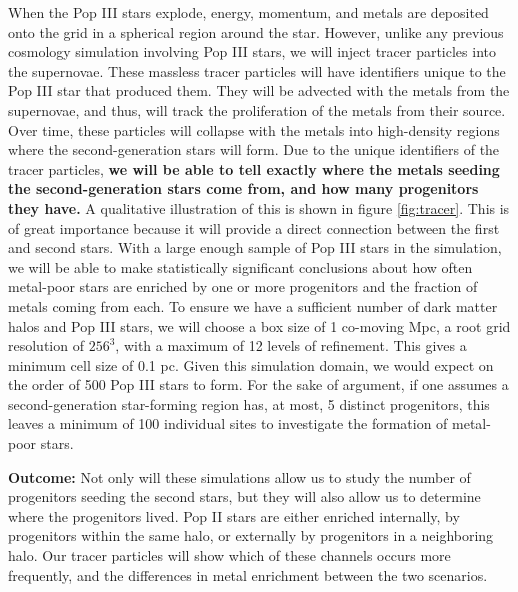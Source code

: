 \documentclass[letterpaper, 12pt]{article}
\begin{document}
When the Pop III stars explode, energy, momentum, and metals are deposited onto the grid in a spherical region around the star. However, unlike any previous cosmology simulation involving Pop III stars, we will inject tracer particles into the supernovae. These massless tracer particles will have identifiers unique to the Pop III star that produced them. They will be advected with the metals from the supernovae, and thus, will track the proliferation of the metals from their source. Over time, these particles will collapse with the metals into high-density regions where the second-generation stars will form. Due to the unique identifiers of the tracer particles, \textbf{we will be able to tell exactly where the metals seeding the second-generation stars come from, and how many progenitors they have.} A qualitative illustration of this is shown in figure \ref{fig:tracer}. This is of great importance because it will provide a direct connection between the first and second stars. With a large enough sample of Pop III stars in the simulation, we will be able to make statistically significant conclusions about how often metal-poor stars are enriched by one or more progenitors and the fraction of metals coming from each. To ensure we have a sufficient number of dark matter halos and Pop III stars, we will choose a box size of 1 co-moving Mpc, a root grid resolution of $256^3$, with a maximum of 12 levels of refinement. This gives a minimum cell size of 0.1 pc. Given this simulation domain, we would expect on the order of 500 Pop III stars to form. For the sake of argument, if one assumes a second-generation star-forming region has, at most, 5 distinct progenitors, this leaves a minimum of 100 individual sites to investigate the formation of metal-poor stars.

\textbf{Outcome:} Not only will these simulations allow us to study the number of progenitors seeding the second stars, but they will also allow us to determine where the progenitors lived. Pop II stars are either enriched internally, by progenitors within the same halo, or externally by progenitors in a neighboring halo. Our tracer particles will show which of these channels occurs more frequently, and the differences in metal enrichment between the two scenarios. 
\end{document}
